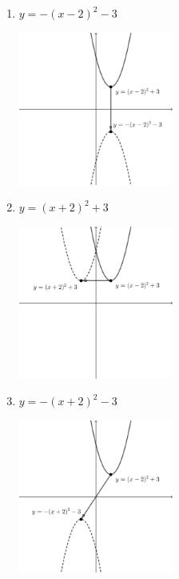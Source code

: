 \documentclass{oblivoir}
\begin{document}
\begin{multicols*}{2}
%
\begin{enumerate}
\item
\(y=-(x-2)^2-3\)
\begin{center}
\includegraphics[width=0.4\textwidth]{rreflect_5-1}
\end{center}
\item
\(y=(x+2)^2+3\)
\begin{center}
\includegraphics[width=0.4\textwidth]{rreflect_5-2}
\end{center}
\newpage
\item
\(y=-(x+2)^2-3\)
\begin{center}
\includegraphics[width=0.4\textwidth]{rreflect_5-3}
\end{center}
\end{enumerate}


\end{multicols*}
\end{document}
